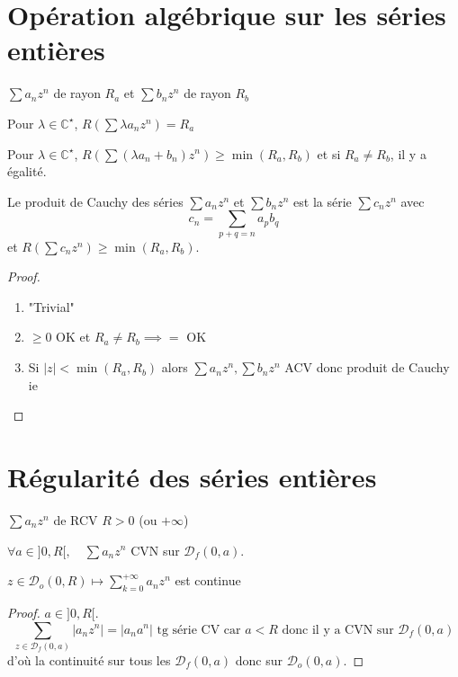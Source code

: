 \section{Opération algébrique sur les séries entières}

\begin{prop}
    \Hyp $\sum a_nz^n$ de rayon $R_a$ et $\sum b_nz^n$ de rayon $R_b$
    \begin{concenum}
    \item Pour $\lambda\in\mathbb C^\star$, $R(\sum \lambda a_nz^n)=R_a$
    \item Pour $\lambda\in\mathbb C^\star$, $R(\sum(\lambda a_n+b_n)z^n)\geq \min(R_a, R_b)$ et si $R_a\neq R_b$, il y a égalité.
    \item Le produit de Cauchy des séries $\sum a_nz^n$ et $\sum b_nz^n$ est la série $\sum c_nz^n$ avec \[
            c_n=\sum_{p+q=n}a_pb_q
        \]
        et $R(\sum c_nz^n)\geq \min(R_a, R_b)$.
    \end{concenum}
\end{prop}

\begin{proof}
    \begin{enumerate}
        \item "Trivial"
        \item $\geq 0$ OK et $R_a\neq R_b\implies =$ OK
        \item Si $|z|<\min(R_a, R_b)$ alors $\sum a_nz^n, \sum b_nz^n$ ACV donc produit de Cauchy ie \conc
    \end{enumerate}
\end{proof}

\section{Régularité des séries entières}

\begin{prop}
    \Hyp $\sum a_nz^n$ de RCV $R>0$ (ou $+\infty$)
    \begin{concenum}
    \item $\forall a\in ]0, R[, \quad \sum a_nz^n$ CVN sur $\mathcal D_f(0, a)$.
    \item $z\in\mathcal D_o(0, R)\longmapsto\displaystyle \sum_{k=0}^{+\infty}a_nz^n$ est continue
    \end{concenum}
\end{prop}

\begin{proof}
    $a\in]0, R[$. \[
        \sum_{z\in\mathcal D_f(0, a)}|a_nz^n|=|a_na^n|\text{ tg série CV car } a<R \text{ donc il y a CVN sur }\mathcal D_f(0, a)
    \]
    d'où la continuité sur tous les $\mathcal D_f(0, a)$ donc sur $\mathcal D_o(0, a)$.
\end{proof}

